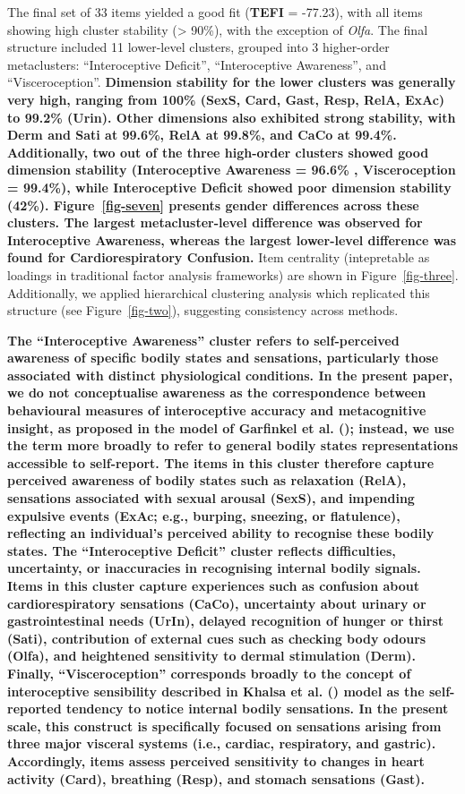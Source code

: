 \documentclass[
  man,
  floatsintext,
  longtable,
  nolmodern,
  notxfonts,
  notimes,
  mask,
  colorlinks=true,linkcolor=blue,citecolor=blue,urlcolor=blue]{apa7}
\begin{document}
The final set of 33 items yielded a good fit (\textbf{TEFI} = -77.23),
with all items showing high cluster stability (\textgreater{} 90\%),
with the exception of \emph{Olfa}. The final structure included 11
lower-level clusters, grouped into 3 higher-order metaclusters:
``Interoceptive Deficit'', ``Interoceptive Awareness'', and
``Visceroception''. \textbf{Dimension stability for the lower clusters
was generally very high, ranging from 100\% (SexS, Card, Gast, Resp,
RelA, ExAc) to 99.2\% (Urin). Other dimensions also exhibited strong
stability, with Derm and Sati at 99.6\%, RelA at 99.8\%, and CaCo at
99.4\%. Additionally, two out of the three high-order clusters showed
good dimension stability (Interoceptive Awareness = 96.6\% ,
Visceroception = 99.4\%), while Interoceptive Deficit showed poor
dimension stability (42\%). Figure~\ref{fig-seven} presents gender
differences across these clusters. The largest metacluster-level
difference was observed for Interoceptive Awareness, whereas the largest
lower-level difference was found for Cardiorespiratory Confusion.} Item
centrality (intepretable as loadings in traditional factor analysis
frameworks) are shown in Figure~\ref{fig-three}. Additionally, we
applied hierarchical clustering analysis which replicated this structure
(see Figure~\ref{fig-two}), suggesting consistency across methods.

\textbf{The ``Interoceptive Awareness'' cluster refers to self-perceived
awareness of specific bodily states and sensations, particularly those
associated with distinct physiological conditions. In the present paper,
we do not conceptualise awareness as the correspondence between
behavioural measures of interoceptive accuracy and metacognitive
insight, as proposed in the model of Garfinkel et al.
(); instead, we use the term
more broadly to refer to general bodily states representations
accessible to self-report. The items in this cluster therefore capture
perceived awareness of bodily states such as relaxation (RelA),
sensations associated with sexual arousal (SexS), and impending
expulsive events (ExAc; e.g., burping, sneezing, or flatulence),
reflecting an individual's perceived ability to recognise these bodily
states. The ``Interoceptive Deficit'' cluster reflects difficulties,
uncertainty, or inaccuracies in recognising internal bodily signals.
Items in this cluster capture experiences such as confusion about
cardiorespiratory sensations (CaCo), uncertainty about urinary or
gastrointestinal needs (UrIn), delayed recognition of hunger or thirst
(Sati), contribution of external cues such as checking body odours
(Olfa), and heightened sensitivity to dermal stimulation (Derm).
Finally, ``Visceroception'' corresponds broadly to the concept of
interoceptive sensibility described in Khalsa et al.
() model as the
self-reported tendency to notice internal bodily sensations. In the
present scale, this construct is specifically focused on sensations
arising from three major visceral systems (i.e., cardiac, respiratory,
and gastric). Accordingly, items assess perceived sensitivity to changes
in heart activity (Card), breathing (Resp), and stomach sensations
(Gast).}
\end{document}
